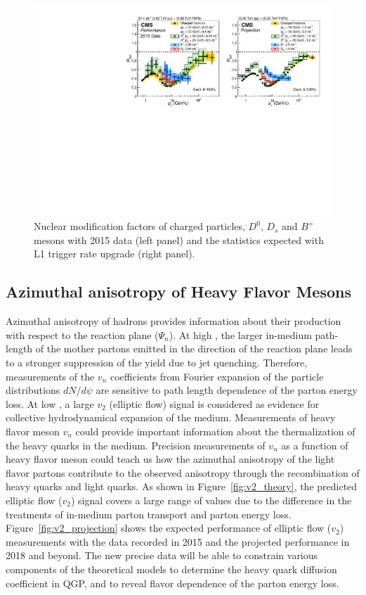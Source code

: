 \begin{figure}[!ht]
\begin{center}
\includegraphics[width=.98\textwidth]{figures/cRAA_lumiTG_3_lumiMB_1_v2.pdf}
\caption{Nuclear modification factors of charged particles, $D^0$, $D_s$ and $B^+$ mesons with 2015 data (left panel) and the statistics expected with L1 trigger rate upgrade (right panel).}
\label{fig:RAA_2015}
\end{center}
\end{figure}

\subsection{Azimuthal anisotropy of Heavy Flavor Mesons}

Azimuthal anisotropy of hadrons provides information about their production with respect to the reaction plane ($\Psi_n$). At high \pt, the larger in-medium path-length of the mother partons emitted in the direction of the reaction plane leads to a stronger suppression of the yield due to jet quenching. Therefore, measurements of the $v_n$ coefficients from Fourier expansion of the particle distributions $dN/d\psi$ are sensitive to path length dependence of the parton energy loss. At low \pt, a large $v_2$ (elliptic flow) signal is considered as evidence for collective hydrodynamical expansion of the medium. Measurements of heavy flavor meson $v_n$ could provide important information about the thermalization of the heavy quarks in the medium. Precision measurements of $v_n$ as a function of heavy flavor meson \pt could teach us how the azimuthal anisotropy of the light flavor partons contribute to the observed anisotropy through the recombination of heavy quarks and light quarks. As shown in Figure~\ref{fig:v2_theory}, the predicted elliptic flow ($v_2$) signal covers a large range of values due to the difference in the treatments of in-medium parton transport and parton energy loss. Figure~\ref{fig:v2_projection} shows the expected performance of elliptic flow ($v_2$) measurements with the data recorded in 2015 and the projected performance in 2018 and beyond. The new precise data will be able to constrain various components of the theoretical models to determine the heavy quark diffusion coefficient in QGP, and to reveal flavor dependence of the parton energy loss.


